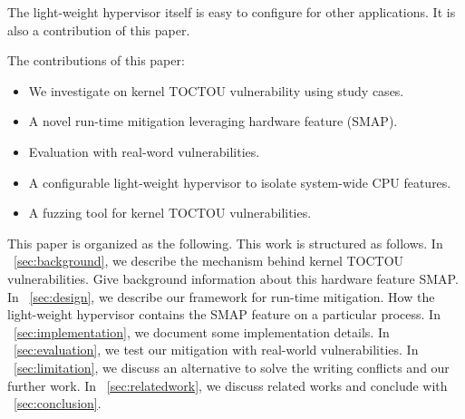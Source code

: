 The light-weight hypervisor itself is easy to configure for other applications. It is also a contribution of this paper.



The contributions of this paper:
\begin{itemize}[leftmargin=*]
    \item We investigate on kernel TOCTOU vulnerability using study cases.
    \item A novel run-time mitigation leveraging hardware feature (SMAP). 
    \item Evaluation with real-word vulnerabilities.
    \item A configurable light-weight hypervisor to isolate system-wide CPU features.
    \item A fuzzing tool for kernel TOCTOU vulnerabilities.
\end{itemize}



This paper is organized as the following. 
This work is structured as follows. In ~\autoref{sec:background}, we describe the mechanism behind kernel TOCTOU vulnerabilities. Give background information about this hardware feature SMAP. In ~\autoref{sec:design}, we describe our framework for run-time mitigation. How the light-weight hypervisor contains the SMAP feature on a particular process. In ~\autoref{sec:implementation}, we document some implementation details. In ~\autoref{sec:evaluation}, we test our mitigation with real-world vulnerabilities.  In ~\autoref{sec:limitation},  we discuss an alternative to solve the writing conflicts and our further work. In ~\autoref{sec:relatedwork}, we discuss related works and conclude with ~\autoref{sec:conclusion}.
